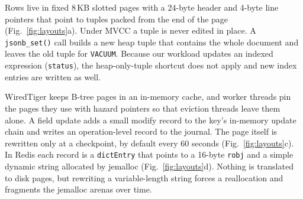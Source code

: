\documentclass[conference,a4paper]{IEEEtran}
\newcommand{\code}[1]{\texttt{\small #1}}
\begin{document}
Rows live in fixed 8\,KB slotted pages with a 24-byte header and 4-byte line pointers that point to tuples packed from the end of the page (Fig.~\ref{fig:layouts}a). Under MVCC a tuple is never edited in place. A \code{jsonb\_set()} call builds a new heap tuple that contains the whole document and leaves the old tuple for \code{VACUUM}. Because our workload updates an indexed expression (\code{status}), the heap-only-tuple shortcut does not apply and new index entries are written as well.

WiredTiger keeps B-tree pages in an in-memory cache, and worker threads pin the pages they use with hazard pointers so that eviction threads leave them alone. A field update adds a small modify record to the key's in-memory update chain and writes an operation-level record to the journal. The page itself is rewritten only at a checkpoint, by default every 60 seconds (Fig.~\ref{fig:layouts}c). In Redis each record is a \code{dictEntry} that points to a 16-byte \code{robj} and a simple dynamic string allocated by jemalloc (Fig.~\ref{fig:layouts}d). Nothing is translated to disk pages, but rewriting a variable-length string forces a reallocation and fragments the jemalloc arenas over time.
\end{document}
